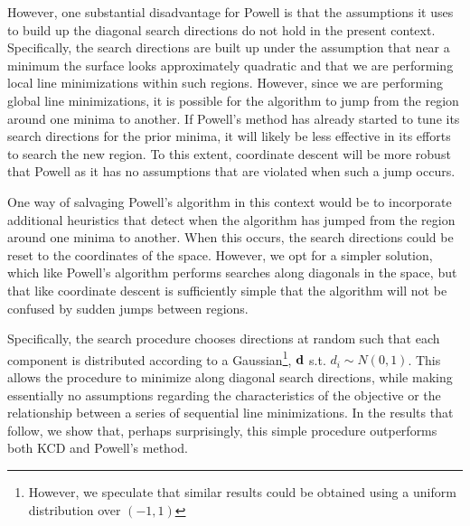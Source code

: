 \documentclass[11pt]{article}
\begin{document}
However, one substantial disadvantage for Powell is that the assumptions it uses to build up the diagonal search directions do not hold in the present context. Specifically, the search directions are built up under the assumption that near a minimum the surface looks approximately quadratic and that we are performing local line minimizations within such regions. However, since we are performing global line minimizations, it is possible for the algorithm to jump from the region around one minima to another. If Powell's method has already started to tune its search directions for the prior minima, it will likely be less effective in its efforts to search the new region. To this extent, coordinate descent will be more robust that Powell as it has no assumptions that are violated when such a jump occurs. 

One way of salvaging Powell's algorithm in this context would be to incorporate additional heuristics that detect when the algorithm has jumped from the region around one minima to another. When this occurs, the search directions could be reset to the coordinates of the space. However, we opt for a simpler solution, which like Powell's algorithm performs searches along diagonals in the space, but that like coordinate descent is sufficiently simple that the algorithm will not be confused by sudden jumps between regions. 

Specifically, the search procedure chooses directions at random such that each component is distributed according to a Gaussian\footnote{However, we speculate that similar results could be obtained using a uniform distribution over \mbox{$(-1,1)$}}, \mbox{${\bf d}$} s.t. \mbox{$d_i \sim N(0,1)$}. This allows the procedure to minimize along diagonal search directions, while making essentially no assumptions regarding the characteristics of the objective or the relationship between a series of sequential line minimizations. In the results that follow, we show that, perhaps surprisingly, this simple procedure outperforms both KCD and Powell's method.

\end{document}
